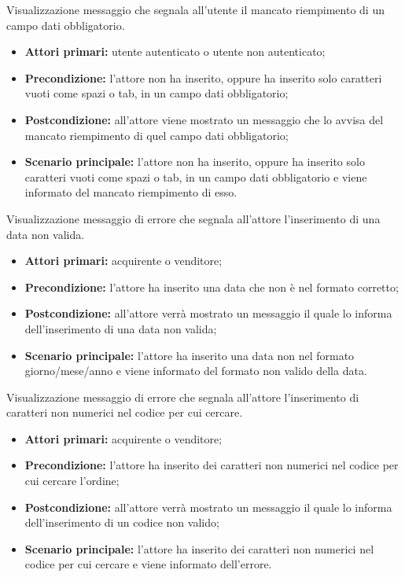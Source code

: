 Visualizzazione messaggio che segnala all'utente il mancato riempimento di un campo dati obbligatorio.
\begin{itemize}
    \item \textbf{Attori primari:} utente autenticato o utente non autenticato;
    \item \textbf{Precondizione:} l'attore non ha inserito, oppure ha inserito solo caratteri vuoti come spazi o tab, in un campo dati obbligatorio;
    \item \textbf{Postcondizione:} all'attore viene mostrato un messaggio che lo avvisa del mancato riempimento di quel campo dati obbligatorio;
    \item \textbf{Scenario principale:} l'attore non ha inserito, oppure ha inserito solo caratteri vuoti come spazi o tab, in un campo dati obbligatorio e viene informato del mancato riempimento di esso.
\end{itemize}


Visualizzazione messaggio di errore che segnala all'attore l'inserimento di una data non valida.
\begin{itemize}
    \item \textbf{Attori primari:} acquirente o venditore;
    \item \textbf{Precondizione:} l'attore ha inserito una data che non è nel formato corretto;
    \item \textbf{Postcondizione:} all'attore verrà mostrato un messaggio il quale lo informa dell'inserimento di una data non valida;
    \item \textbf{Scenario principale:} l'attore ha inserito una data non nel formato giorno/mese/anno e viene informato del formato non valido della data.
\end{itemize}


Visualizzazione messaggio di errore che segnala all'attore l'inserimento di caratteri non numerici nel codice per cui cercare.
\begin{itemize}
    \item \textbf{Attori primari:} acquirente o venditore;
    \item \textbf{Precondizione:} l'attore ha inserito dei caratteri non numerici nel codice per cui cercare l'ordine;
    \item \textbf{Postcondizione:} all'attore verrà mostrato un messaggio il quale lo informa dell'inserimento di un codice non valido;
    \item \textbf{Scenario principale:} l'attore ha inserito dei caratteri non numerici nel codice per cui cercare e viene informato dell'errore.
\end{itemize}


